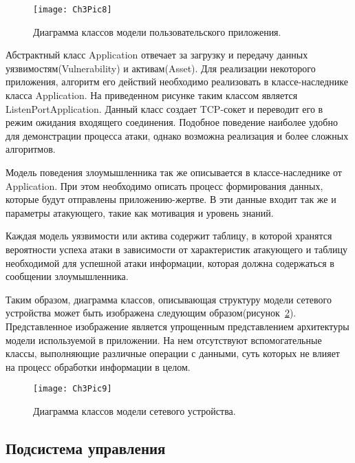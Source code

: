     \begin{figure}[h!]\center
        \texttt{[image: Ch3Pic8]}
        \caption{Диаграмма классов модели пользовательского приложения. } \label{Pic8}
    \end{figure}

    Абстрактный класс Application отвечает за загрузку и передачу данных уязвимостям(Vulnerability) и активам(Asset). Для реализации некоторого приложения, алгоритм его действий необходимо реализовать в классе-наследнике класса Application. На приведенном рисунке таким классом является ListenPortApplication. Данный класс создает TCP-сокет и переводит его в режим ожидания входящего соединения. Подобное поведение наиболее удобно для демонстрации процесса атаки, однако возможна реализация и более сложных алгоритмов.

    Модель поведения злоумышленника так же описывается в классе-наследнике от Application. При этом необходимо описать процесс формирования данных, которые будут отправлены приложению-жертве. В эти данные входит так же и параметры атакующего, такие как мотивация и уровень знаний.

    Каждая модель уязвимости или актива содержит таблицу, в которой хранятся вероятности успеха атаки в зависимости от характеристик атакующего и таблицу необходимой для успешной атаки информации, которая должна содержаться в сообщении злоумышленника.

    Таким образом, диаграмма классов, описывающая структуру модели сетевого устройства может быть изображена следующим образом(рисунок~\ref{Pic9}). Представленное изображение является упрощенным представлением архитектуры модели используемой в приложении. На нем отсутствуют вспомогательные классы, выполняющие различные операции с данными, суть которых не влияет на процесс обработки информации в целом.

    \begin{figure}[pH]\center
        \texttt{[image: Ch3Pic9]}
        \caption{Диаграмма классов модели сетевого устройства. } \label{Pic9}
    \end{figure}

    \subsection{Подсистема управления}

